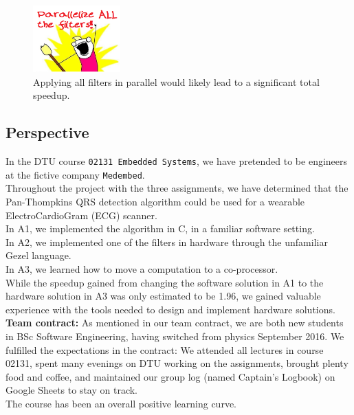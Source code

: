 \begin{figure}[H]
    \centering
    \includegraphics[width=0.3\textwidth]{4Conclusion/ALLfilters.png}
    \caption{Applying all filters in parallel would likely lead to a significant total speedup.}
    \label{fig:ALLfilters}
\end{figure}


\subsection{Perspective}
In the DTU course \texttt{02131 Embedded Systems}, we have pretended to be engineers at the fictive company \texttt{Medembed}.\\

Throughout the project with the three assignments, we have determined that the Pan-Thompkins QRS detection algorithm could be used for a wearable ElectroCardioGram (ECG) scanner.\\

In A1, we implemented the algorithm in C, in a familiar software setting.\\
In A2, we implemented one of the filters in hardware through the unfamiliar Gezel language.\\
In A3, we learned how to move a computation to a co-processor.\\

While the speedup gained from changing the software solution in A1 to the hardware solution in A3 was only estimated to be 1.96, we gained valuable experience with the tools needed to design and implement hardware solutions.\\

\textbf{Team contract:} As mentioned in our team contract, we are both new students in BSc Software Engineering, having switched from physics September 2016. We fulfilled the expectations in the contract: We attended all lectures in course 02131, spent many evenings on DTU working on the assignments, brought plenty food and coffee, and maintained our group log (named Captain's Logbook) on Google Sheets to stay on track. \\ 

The course has been an overall positive learning curve. 